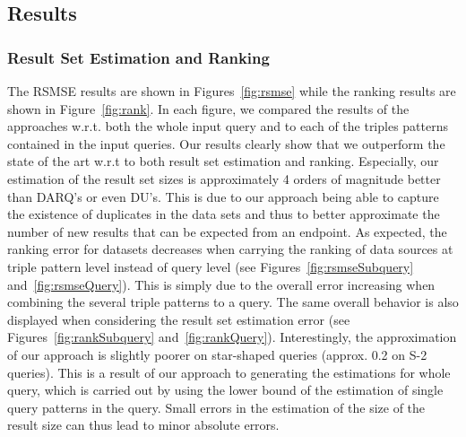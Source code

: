 \documentclass{sig-alternate}  %
\begin{document}
\subsection{Results}

\subsubsection{Result Set Estimation and Ranking}
The RSMSE results are shown in Figures~\ref{fig:rsmse} while the ranking results are shown in Figure~\ref{fig:rank}.
In each figure, we compared the results of the approaches w.r.t. both the whole input query and to each of the triples patterns contained in the input queries.
Our results clearly show that we outperform the state of the art w.r.t to both result set estimation and ranking.
Especially, our estimation of the result set sizes is approximately 4 orders of magnitude better than DARQ's or even DU's. 
This is due to our approach being able to capture the existence of duplicates in the data sets and thus to better approximate the number of new results that can be expected from  an endpoint.
As expected, the ranking error for datasets decreases when carrying the ranking of data sources at triple pattern level instead of query level (see Figures~\ref{fig:rsmseSubquery} and~\ref{fig:rsmseQuery}).
This is simply due to the overall error increasing when combining the several triple patterns to a query.
The same overall behavior is also displayed when considering the result set estimation error (see Figures~\ref{fig:rankSubquery} and~\ref{fig:rankQuery}). 
Interestingly, the approximation of our approach is slightly poorer on star-shaped queries (approx. 0.2 on S-2 queries).
This is a result of our approach to generating the estimations for whole query, which is carried out by using the lower bound of the estimation of single query patterns in the query. 
Small errors in the estimation of the size of the result size can thus lead to minor absolute errors.
\end{document}
